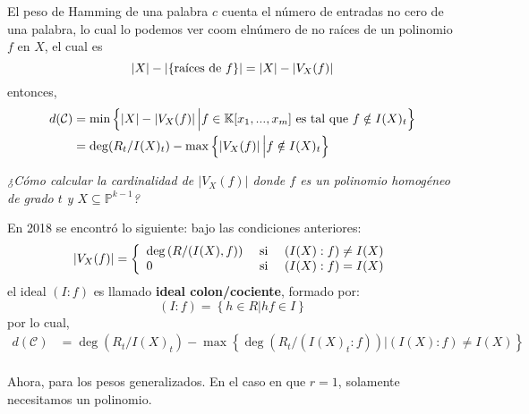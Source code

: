 \documentclass[12pt]{report}
\newcounter{it}
\theoremstyle{largebreak}
\newcommand\abs[1]{\ensuremath{\left|#1\right|}}
\begin{document}
    El peso de Hamming de una palabra $c$ cuenta el número de entradas no cero de una palabra, lo cual lo podemos ver coom elnúmero de no raíces de un polinomio $f$ en $X$, el cual es
    \begin{equation*}
        \abs{X}-\abs{\left\{\textup{raíces de }f \right\}}=\abs{X}-\abs{V_X(f)}
    \end{equation*}
    entonces,
    \begin{equation*}
        \begin{split}
            d(\mathcal{C})&=\min\left\{\abs{X}-\abs{V_X(f)}\Big|f\in\mathbb{K}[x_1,...,x_m]\textup{ es tal que }f\notin I(X)_t \right\}\\
            &=\deg(R_t/I(X)_t)-\max\left\{\abs{V_X(f)}\Big|f\notin I(X)_t \right\}\\
        \end{split}
    \end{equation*}

    \begin{center}
        \textit{¿Cómo calcular la cardinalidad de $\abs{V_X(f)}$ donde $f$ es un polinomio homogéneo de grado $t$ y $X\subseteq\mathbb{P}^{k-1}$?}
    \end{center}

    En 2018 se encontró lo siguiente: bajo las condiciones anteriores:
    \begin{equation*}
        \abs{V_X(f)}=\left\{
            \begin{array}{lcr}
                \deg\left(R/(I(X),f) \right) & \textup{ si } & (I(X):f)\neq I(X) \\
                0 & \textup{ si } & (I(X):f)= I(X) \\
            \end{array}
        \right.
    \end{equation*}
    el ideal $(I:f)$ es llamado \textbf{ideal colon/cociente}, formado por:
    \begin{equation*}
        (I:f)=\left\{h\in R\Big|hf\in I \right\}
    \end{equation*}
    por lo cual,
    \begin{equation*}
        \begin{split}
            d(\mathcal{C})&=\deg(R_t/I(X)_t)-\max\left\{\deg(R_t/(I(X)_t:f))\Big|(I(X):f)\neq I(X) \right\}\\
        \end{split}
    \end{equation*}

    Ahora, para los pesos generalizados. En el caso en que $r=1$, solamente necesitamos un polinomio.
\end{document}
